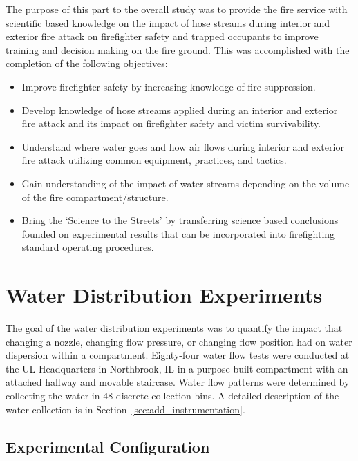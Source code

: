 \documentclass{article}
\begin{document}
The purpose of this part to the overall study was to provide the fire service with scientific based knowledge on the impact of hose streams during interior and exterior fire attack on firefighter safety and trapped occupants to improve training and decision making on the fire ground. This was accomplished with the completion of the following objectives:

\begin{itemize}
	\item Improve firefighter safety by increasing knowledge of fire suppression.
	\item Develop knowledge of hose streams applied during an interior and exterior fire attack and its impact on firefighter safety and victim survivability.
	\item Understand where water goes and how air flows during interior and exterior fire attack utilizing common equipment, practices, and tactics.
	\item Gain understanding of the impact of water streams depending on the volume of the fire compartment/structure.
	\item Bring the `Science to the Streets' by transferring science based conclusions founded on experimental results that can be incorporated into firefighting standard operating procedures.
	\end{itemize}

\clearpage


\section{Water Distribution Experiments}

The goal of the water distribution experiments was to quantify the impact that changing a nozzle, changing flow pressure, or changing flow position had on water dispersion within a compartment. Eighty-four water flow tests were conducted at the UL Headquarters in Northbrook, IL in a purpose built compartment with an attached hallway and movable staircase. Water flow patterns were determined by collecting the water in 48 discrete collection bins. A detailed description of the water collection is in Section~\ref{sec:add_instrumentation}.

\subsection{Experimental Configuration}
\end{document}
